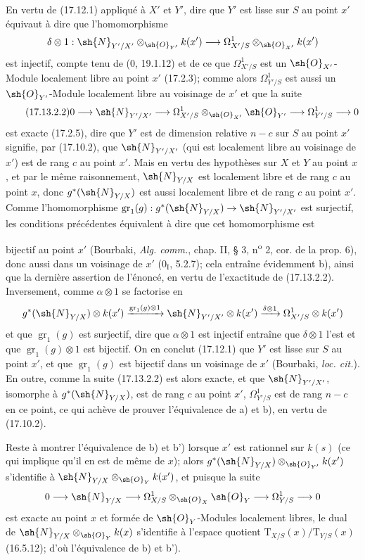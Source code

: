En vertu de (17.12.1) appliqué à $X'$ et $Y'$, dire que $Y'$ est lisse sur $S$ au point $x'$ équivaut à dire que l'homomorphisme
\[
\delta\otimes1:\sh{N}_{Y'/X'}\otimes_{\sh{O}_{Y'}}k(x')\to\Omega^1_{X'/S}\otimes_{\sh{O}_{X'}}k(x')
\]
est injectif, compte tenu de (0, 19.1.12) et de ce que $\Omega^1_{X'/S}$ est un $\sh{O}_{X'}$-Module localement libre au point $x'$ (17.2.3); comme alors $\Omega^1_{Y'/S}$ est aussi un $\sh{O}_{Y'}$-Module localement libre au voisinage de $x'$ et que la suite
\[
\label{IV.17.13.2.2}
\tag{17.13.2.2}
0\to\sh{N}_{Y'/X'}\to\Omega^1_{X'/S}\otimes_{\sh{O}_{X'}}\sh{O}_{Y'}\to\Omega^1_{Y'/S}\to0
\]
est exacte (17.2.5), dire que $Y'$ est de dimension relative $n-c$ sur $S$ au point $x'$ signifie, par (17.10.2), que $\sh{N}_{Y'/X'}$ (qui est localement libre au voisinage de $x'$) est de rang $c$ au point $x'$. Mais en vertu des hypothèses sur $X$ et $Y$ au point $x$, et par le même raisonnement, $\sh{N}_{Y/X}$ est localement libre et de rang $c$ au point $x$, donc $g^*(\sh{N}_{Y/X})$ est aussi localement libre et de rang $c$ au point $x'$. Comme l'homomorphisme $\operatorname{gr}_1(g):g^*(\sh{N}_{Y/X})\to\sh{N}_{Y'/X'}$ est surjectif, les conditions précédentes équivalent à dire que cet homomorphisme est


bijectif au point $x'$ (Bourbaki, \emph{Alg. comm.}, chap. II, § 3, n\textsuperscript{o} 2, cor. de la prop. 6), donc aussi dans un voisinage de $x'$ (0$_{\mathrm I}$, 5.2.7); cela entraîne évidemment b), ainsi que la dernière assertion de l'énoncé, en vertu de l'exactitude de (17.13.2.2). Inversement, comme $\alpha\otimes1$ se factorise en
\[
g^*(\sh{N}_{Y/X})\otimes k(x')\xrightarrow{\operatorname{gr}_1(g)\otimes1}\sh{N}_{Y'/X'}\otimes k(x')\xrightarrow{\delta\otimes1}\Omega^1_{X'/S}\otimes k(x')
\]
et que $\operatorname{gr}_1(g)$ est surjectif, dire que $\alpha\otimes1$ est injectif entraîne que $\delta\otimes1$ l'est et que $\operatorname{gr}_1(g)\otimes1$ est bijectif. On en conclut (17.12.1) que $Y'$ est lisse sur $S$ au point $x'$, et que $\operatorname{gr}_1(g)$ est bijectif dans un voisinage de $x'$ (Bourbaki, \emph{loc. cit.}). En outre, comme la suite (17.13.2.2) est alors exacte, et que $\sh{N}_{Y'/X'}$, isomorphe à $g^*(\sh{N}_{Y/X})$, est de rang $c$ au point $x'$, $\Omega^1_{Y'/S}$ est de rang $n-c$ en ce point, ce qui achève de prouver l'équivalence de a) et b), en vertu de (17.10.2).

Reste à montrer l'équivalence de b) et b') lorsque $x'$ est rationnel sur $k(s)$ (ce qui implique qu'il en est de même de $x$); alors $g^*(\sh{N}_{Y/X})\otimes_{\sh{O}_{Y'}}k(x')$ s'identifie à $\sh{N}_{Y/X}\otimes_{\sh{O}_Y}k(x')$, et puisque la suite
\[
0\to\sh{N}_{Y/X}\to\Omega^1_{X/S}\otimes_{\sh{O}_X}\sh{O}_Y\to\Omega^1_{Y/S}\to0
\]
est exacte au point $x$ et formée de $\sh{O}_Y$-Modules localement libres, le dual de $\sh{N}_{Y/X}\otimes_{\sh{O}_Y}k(x)$ s'identifie à l'espace quotient $\mathrm{T}_{X/S}(x)/\mathrm{T}_{Y/S}(x)$ (16.5.12); d'où l'équivalence de b) et b').

